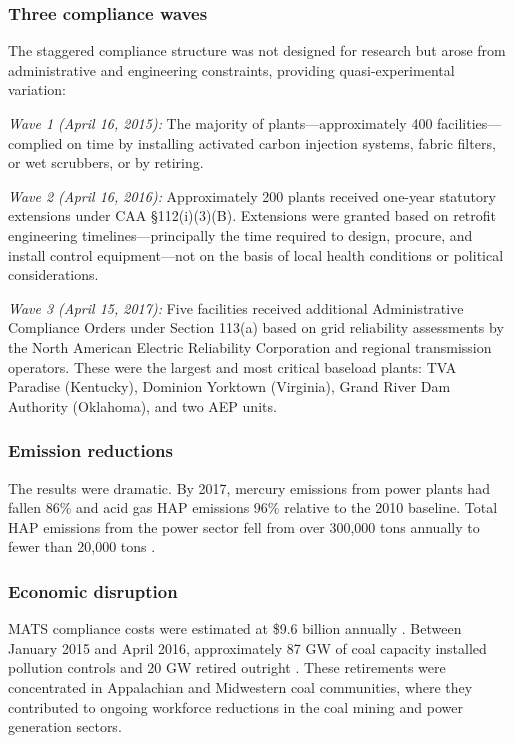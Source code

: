 \documentclass[12pt]{article}
\begin{document}
\subsubsection*{Three compliance waves} The staggered compliance structure was not designed for research but arose from administrative and engineering constraints, providing quasi-experimental variation:

\textit{Wave 1 (April 16, 2015):} The majority of plants---approximately 400 facilities---complied on time by installing activated carbon injection systems, fabric filters, or wet scrubbers, or by retiring.

\textit{Wave 2 (April 16, 2016):} Approximately 200 plants received one-year statutory extensions under CAA \S112(i)(3)(B). Extensions were granted based on retrofit engineering timelines---principally the time required to design, procure, and install control equipment---not on the basis of local health conditions or political considerations.

\textit{Wave 3 (April 15, 2017):} Five facilities received additional Administrative Compliance Orders under Section 113(a) based on grid reliability assessments by the North American Electric Reliability Corporation and regional transmission operators. These were the largest and most critical baseload plants: TVA Paradise (Kentucky), Dominion Yorktown (Virginia), Grand River Dam Authority (Oklahoma), and two AEP units.

\subsubsection*{Emission reductions} The results were dramatic. By 2017, mercury emissions from power plants had fallen 86\% and acid gas HAP emissions 96\% relative to the 2010 baseline. Total HAP emissions from the power sector fell from over 300,000 tons annually to fewer than 20,000 tons \citep{epa2020mats}.

\subsubsection*{Economic disruption} MATS compliance costs were estimated at \$9.6 billion annually \citep{epa2011ria}. Between January 2015 and April 2016, approximately 87 GW of coal capacity installed pollution controls and 20 GW retired outright \citep{eia2016mats}. These retirements were concentrated in Appalachian and Midwestern coal communities, where they contributed to ongoing workforce reductions in the coal mining and power generation sectors.
\end{document}
